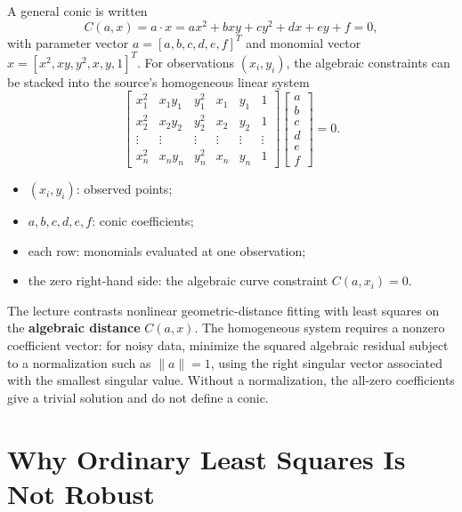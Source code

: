 \documentclass[11pt,a4paper,oneside]{report}
\newcommand{\mathlegend}[1]{%
  \par\vspace{0.2em}{\small\itshape where}\par
  \begin{itemize}[leftmargin=1.7em,topsep=0.15em,itemsep=0.12em]
  #1
  \end{itemize}
}
\begin{document}
A general conic is written
\begin{equation}
  C(a,x)=a\cdot x=ax^2+bxy+cy^2+dx+ey+f=0,
  \label{eq:general-conic}
\end{equation}
with parameter vector $a=[a,b,c,d,e,f]^T$ and monomial vector $x=[x^2,xy,y^2,x,y,1]^T$. For observations $(x_i,y_i)$, the algebraic constraints can be stacked into the source's homogeneous linear system
\begin{equation}
\begin{bmatrix}
 x_1^2&x_1y_1&y_1^2&x_1&y_1&1\\
 x_2^2&x_2y_2&y_2^2&x_2&y_2&1\\
 \vdots&\vdots&\vdots&\vdots&\vdots&\vdots\\
 x_n^2&x_ny_n&y_n^2&x_n&y_n&1
\end{bmatrix}
\begin{bmatrix}a\\b\\c\\d\\e\\f\end{bmatrix}=0.
\label{eq:conic-algebraic-system}
\end{equation}
\mathlegend{
  \item $(x_i,y_i)$: observed points;
  \item $a,b,c,d,e,f$: conic coefficients;
  \item each row: monomials evaluated at one observation;
  \item the zero right-hand side: the algebraic curve constraint $C(a,x_i)=0$.
}
The lecture contrasts nonlinear geometric-distance fitting with least squares on the \textbf{algebraic distance} $C(a,x)$. The homogeneous system requires a nonzero coefficient vector: for noisy data, minimize the squared algebraic residual subject to a normalization such as $\lVert a\rVert=1$, using the right singular vector associated with the smallest singular value. Without a normalization, the all-zero coefficients give a trivial solution and do not define a conic.

\section{Why Ordinary Least Squares Is Not Robust}
\end{document}
